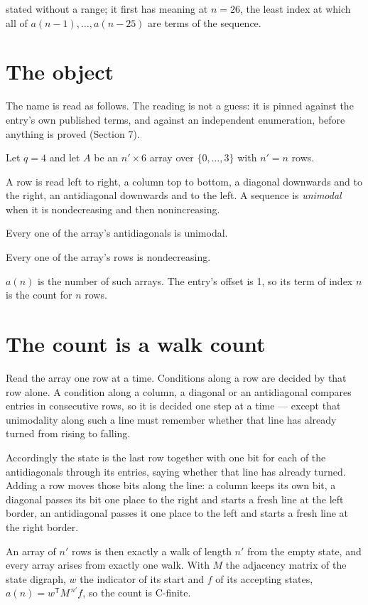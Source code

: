 \documentclass[11pt]{article}
\theoremstyle{definition}
\begin{document}
stated without a range; it first has meaning at $n = 26$, the least index at which all of $a(n-1),\dots,a(n-25)$ are terms of the sequence.

\section{The object}

The name is read as follows. The reading is not a guess: it is pinned against the entry's own published terms, and against an independent enumeration, before anything is proved (Section 7).

Let $q = 4$ and let $A$ be an $n' \times 6$ array over $\{0,\dots,3\}$ with $n' = n$ rows.

A row is read left to right, a column top to bottom, a diagonal downwards and to the right, an antidiagonal downwards and to the left. A sequence is {\itshape unimodal} when it is nondecreasing and then nonincreasing.

Every one of the array's antidiagonals is unimodal.

Every one of the array's rows is nondecreasing.

$a(n)$ is the number of such arrays. The entry's offset is 1, so its term of index $n$ is the count for $n$ rows.

\section{The count is a walk count}

Read the array one row at a time. Conditions along a row are decided by that row alone. A condition along a column, a diagonal or an antidiagonal compares entries in consecutive rows, so it is decided one step at a time --- except that unimodality along such a line must remember whether that line has already turned from rising to falling.

Accordingly the state is the last row together with one bit for each of the antidiagonals through its entries, saying whether that line has already turned. Adding a row moves those bits along the line: a column keeps its own bit, a diagonal passes its bit one place to the right and starts a fresh line at the left border, an antidiagonal passes it one place to the left and starts a fresh line at the right border.

An array of $n'$ rows is then exactly a walk of length $n'$ from the empty state, and every array arises from exactly one walk. With $M$ the adjacency matrix of the state digraph, $w$ the indicator of its start and $f$ of its accepting states, $a(n) = w^{\mathsf T}M^{\,n'}f$, so the count is C-finite.
\end{document}
